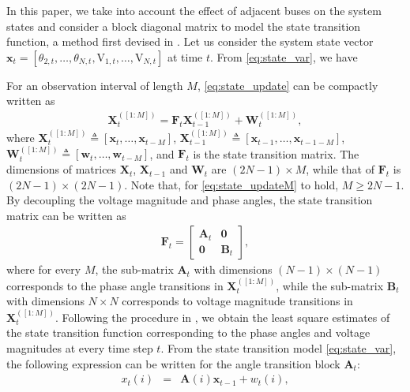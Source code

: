 \documentclass[10pt,journal,twocolumn]{IEEEtran}\IEEEoverridecommandlockouts
\begin{document}
In this paper, we take into account the effect of adjacent buses on the system states and consider a block diagonal matrix to model the state transition function, a method first devised in \cite{Hassanzadeh2012}. Let us consider the system state vector $\boldsymbol{x}_{t} = [\theta_{2,t},\dots,\theta_{N,t}, \mathrm{V}_{1,t},\dots,\mathrm{V}_{N,t}]$ at time $t$. From \eqref{eq:state_var}, we have

For an observation interval of length $M$, \eqref{eq:state_update} can be compactly written as
\begin{eqnarray}\label{eq:state_updateM}
\boldsymbol{X}_{t}^{([1:M])} = \boldsymbol{F}_{t}\boldsymbol{X}_{t-1}^{([1:M])} + \boldsymbol{W}_{t}^{([1:M])},
\end{eqnarray}
where $\boldsymbol{X}_{t}^{([1:M])} \triangleq [\boldsymbol{x}_{t},\dots,\boldsymbol{x}_{t-M}]$, $\boldsymbol{X}_{t-1}^{([1:M])} \triangleq [\boldsymbol{x}_{t-1},\dots,\boldsymbol{x}_{t-1-M}]$, $\boldsymbol{W}_{t}^{([1:M])} \triangleq [\boldsymbol{w}_{t},\dots,\boldsymbol{w}_{t-M}]$, and $\boldsymbol{F}_{t}$ is the state transition matrix. The dimensions of matrices $\boldsymbol{X}_{t}$, $\boldsymbol{X}_{t-1}$ and $\boldsymbol{W}_{t}$ are $(2N-1)\times M$, while that of $\boldsymbol{F}_{t}$ is $(2N-1)\times (2N-1)$. Note that, for \eqref{eq:state_updateM} to hold, $M \geq 2N-1$. By decoupling the voltage magnitude and phase angles, the state transition matrix can be written as
\begin{eqnarray}\label{eq:statetran_matrix}
\boldsymbol{F}_{t} =
\left[\begin{matrix}
\boldsymbol{A}_{t} & \boldsymbol{0} \\
\boldsymbol{0} & \boldsymbol{B}_{t}
\end{matrix}\right],
\end{eqnarray}
where for every $M$, the sub-matrix $\boldsymbol{A}_{t}$ with dimensions $(N-1)\times(N-1)$ corresponds to the phase angle transitions in $\boldsymbol{X}_{t}^{([1:M])}$, while the sub-matrix $\boldsymbol{B}_{t}$ with dimensions $N\times N$ corresponds to voltage magnitude transitions in $\boldsymbol{X}_{t}^{([1:M])}$. Following the procedure in \cite[Section III]{Hassanzadeh2012}, we obtain the least square estimates of the state transition function corresponding to the phase angles and voltage magnitudes at every time step $t$. From the state transition model \eqref{eq:state_var}, the following expression can be written for the angle transition block $\boldsymbol{A}_{t}$:
\begin{eqnarray}
{x}_{t}(i) &=& \boldsymbol{A}(i)\boldsymbol{x}_{t-1} + {w}_{t}(i),\label{eq:angle_block1}
\end{eqnarray}
\end{document}
